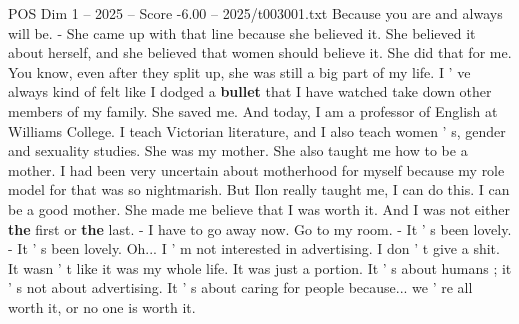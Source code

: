 \begin{textsample}{POS Dim 1 – 2025 – Score -6.00 – 2025/t003001.txt}
Because you are and always will be. - She came up with that line because she believed it.
She believed it about herself, and she believed that women should believe it.
She did that for me.
You know, even after they split up, she was still a big part of my life.
I ' ve always kind of felt like I dodged a \textbf{bullet} that I have watched take down other members of my family.
She saved me.
And today, I am a professor of English at Williams College.
I teach Victorian literature, and I also teach women ' s, gender and sexuality studies.
She was my mother.
She also taught me how to be a mother.
I had been very uncertain about motherhood for myself because my role model for that was so nightmarish.
But Ilon really taught me, I can do this.
I can be a good mother.
She made me believe that I was worth it.
And I was not either \textbf{the} first or \textbf{the} last. - I have to go away now.
Go to my room. - It ' s been lovely. - It ' s been lovely.
Oh...
I ' m not interested in advertising.
I don ' t give a shit.
It wasn ' t like it was my whole life.
It was just a portion.
It ' s about humans ; it ' s not about advertising.
It ' s about caring for people because... we ' re all worth it, or no one is worth it.

\end{textsample}
